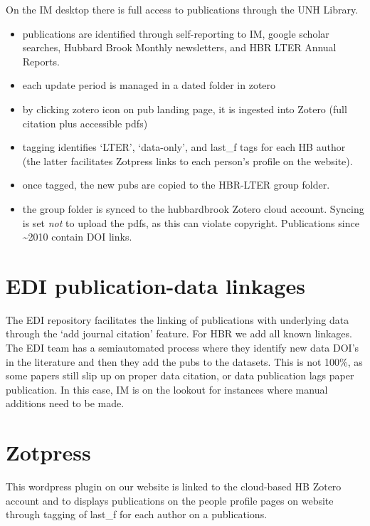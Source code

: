 \documentclass[
  letterpaper,
  DIV=11,
  numbers=noendperiod]{scrreprt}
\providecommand{\tightlist}{%
  \setlength{\itemsep}{0pt}\setlength{\parskip}{0pt}}\usepackage{longtable,booktabs,array}
\begin{document}
On the IM desktop there is full access to publications through the UNH
Library.

\begin{itemize}
\tightlist
\item
  publications are identified through self-reporting to IM, google
  scholar searches, Hubbard Brook Monthly newsletters, and HBR LTER
  Annual Reports.
\item
  each update period is managed in a dated folder in zotero
\item
  by clicking zotero icon on pub landing page, it is ingested into
  Zotero (full citation plus accessible pdfs)
\item
  tagging identifies `LTER', `data-only', and last\_f tags for each HB
  author (the latter facilitates Zotpress links to each person's profile
  on the website).
\item
  once tagged, the new pubs are copied to the HBR-LTER group folder.
\item
  the group folder is synced to the hubbardbrook Zotero cloud account.
  Syncing is set \emph{not} to upload the pdfs, as this can violate
  copyright. Publications since \textasciitilde2010 contain DOI links.
\end{itemize}

\section{EDI publication-data
linkages}\label{edi-publication-data-linkages}

The EDI repository facilitates the linking of publications with
underlying data through the `add journal citation' feature. For HBR we
add all known linkages. The EDI team has a semiautomated process where
they identify new data DOI's in the literature and then they add the
pubs to the datasets. This is not 100\%, as some papers still slip up on
proper data citation, or data publication lags paper publication. In
this case, IM is on the lookout for instances where manual additions
need to be made.

\section{Zotpress}\label{zotpress}

This wordpress plugin on our website is linked to the cloud-based HB
Zotero account and to displays publications on the people profile pages
on website through tagging of last\_f for each author on a publications.
\end{document}
